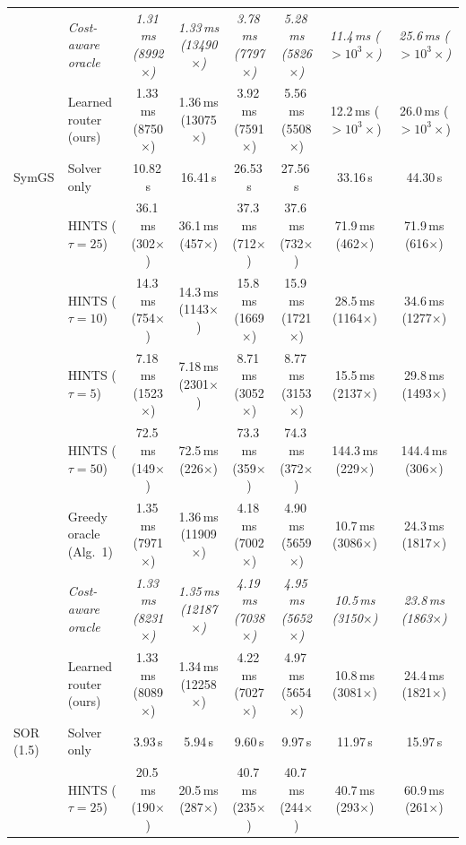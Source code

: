 {\begin{tabular}{llcccccc}
 & \textit{Cost-aware oracle} & \textit{1.31\,ms (8992$\times$)} & \textit{1.33\,ms (13490$\times$)} & \textit{3.78\,ms (7797$\times$)} & \textit{5.28\,ms (5826$\times$)} & \textit{11.4\,ms ($>10^{3}\times$)} & \textit{25.6\,ms ($>10^{3}\times$)} \\
 & Learned router (ours) & 1.33\,ms (8750$\times$) & 1.36\,ms (13075$\times$) & 3.92\,ms (7591$\times$) & 5.56\,ms (5508$\times$) & 12.2\,ms ($>10^{3}\times$) & 26.0\,ms ($>10^{3}\times$) \\
\midrule
SymGS & Solver only & 10.82\,s & 16.41\,s & 26.53\,s & 27.56\,s & 33.16\,s & 44.30\,s \\
 & HINTS ($\tau{=}25$) & 36.1\,ms (302$\times$) & 36.1\,ms (457$\times$) & 37.3\,ms (712$\times$) & 37.6\,ms (732$\times$) & 71.9\,ms (462$\times$) & 71.9\,ms (616$\times$) \\
 & HINTS ($\tau{=}10$) & 14.3\,ms (754$\times$) & 14.3\,ms (1143$\times$) & 15.8\,ms (1669$\times$) & 15.9\,ms (1721$\times$) & 28.5\,ms (1164$\times$) & 34.6\,ms (1277$\times$) \\
 & HINTS ($\tau{=}5$) & 7.18\,ms (1523$\times$) & 7.18\,ms (2301$\times$) & 8.71\,ms (3052$\times$) & 8.77\,ms (3153$\times$) & 15.5\,ms (2137$\times$) & 29.8\,ms (1493$\times$) \\
 & HINTS ($\tau{=}50$) & 72.5\,ms (149$\times$) & 72.5\,ms (226$\times$) & 73.3\,ms (359$\times$) & 74.3\,ms (372$\times$) & 144.3\,ms (229$\times$) & 144.4\,ms (306$\times$) \\
 & Greedy oracle (Alg.~1) & 1.35\,ms (7971$\times$) & 1.36\,ms (11909$\times$) & 4.18\,ms (7002$\times$) & 4.90\,ms (5659$\times$) & 10.7\,ms (3086$\times$) & 24.3\,ms (1817$\times$) \\
 & \textit{Cost-aware oracle} & \textit{1.33\,ms (8231$\times$)} & \textit{1.35\,ms (12187$\times$)} & \textit{4.19\,ms (7038$\times$)} & \textit{4.95\,ms (5652$\times$)} & \textit{10.5\,ms (3150$\times$)} & \textit{23.8\,ms (1863$\times$)} \\
 & Learned router (ours) & 1.33\,ms (8089$\times$) & 1.34\,ms (12258$\times$) & 4.22\,ms (7027$\times$) & 4.97\,ms (5654$\times$) & 10.8\,ms (3081$\times$) & 24.4\,ms (1821$\times$) \\
\midrule
SOR (1.5) & Solver only & 3.93\,s & 5.94\,s & 9.60\,s & 9.97\,s & 11.97\,s & 15.97\,s \\
 & HINTS ($\tau{=}25$) & 20.5\,ms (190$\times$) & 20.5\,ms (287$\times$) & 40.7\,ms (235$\times$) & 40.7\,ms (244$\times$) & 40.7\,ms (293$\times$) & 60.9\,ms (261$\times$) \\

\end{tabular}}
